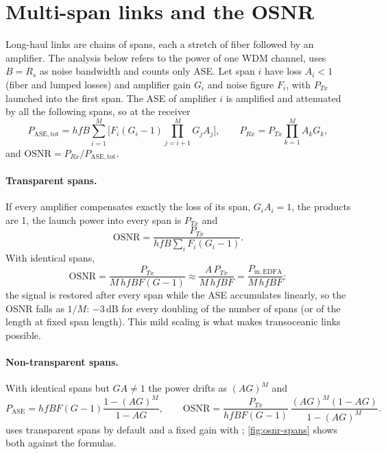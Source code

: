 \section{Multi-span links and the OSNR}\label{sec:multispan}
Long-haul links are chains of spans, each a stretch of fiber followed by an amplifier. The
analysis below refers to the power of one WDM channel, uses $B=R_s$ as noise bandwidth and counts
only ASE. Let span $i$ have loss $A_i<1$ (fiber and lumped losses) and amplifier gain $G_i$ and noise
figure $F_i$, with $P_{Tx}$ launched into the first span. The ASE of amplifier $i$ is amplified and
attenuated by all the following spans, so at the receiver
\begin{equation}
  P_{\mathrm{ASE,tot}}=hfB\sum_{i=1}^{M}\Big[F_i(G_i-1)\prod_{j=i+1}^{M}G_jA_j\Big],\qquad
  P_{Rx}=P_{Tx}\prod_{k=1}^{M}A_kG_k,
\end{equation}
and $\mathrm{OSNR}=P_{Rx}/P_{\mathrm{ASE,tot}}$.

\paragraph{Transparent spans.} If every amplifier compensates exactly the loss of its span,
$G_iA_i=1$, the products are 1, the launch power into every span is $P_{Tx}$ and
\begin{equation}
  \mathrm{OSNR}=\frac{P_{Tx}}{hfB\sum_iF_i(G_i-1)} .
\end{equation}
With identical spans,
\begin{equation}
  \mathrm{OSNR}=\frac{P_{Tx}}{M\,hfBF(G-1)}\approx\frac{A\,P_{Tx}}{M\,hfBF}=\frac{P_{\mathrm{in,EDFA}}}{M\,hfBF}:
  \label{eq:osnr-identical}
\end{equation}
the signal is restored after every span while the ASE accumulates linearly, so the OSNR falls as
$1/M$: $-3$\,dB for every doubling of the number of spans (or of the length at fixed span length).
This mild scaling is what makes transoceanic links possible.

\paragraph{Non-transparent spans.} With identical spans but $GA\ne1$ the power drifts as $(AG)^M$ and
\begin{equation}
  P_{\mathrm{ASE}}=hfBF(G-1)\frac{1-(AG)^M}{1-AG},\qquad
  \mathrm{OSNR}=\frac{P_{Tx}}{hfBF(G-1)}\,\frac{(AG)^M(1-AG)}{1-(AG)^M}.
\end{equation}
 uses transparent spans by default and a fixed gain with
; \cref{fig:osnr-spans} shows both against the formulas.

